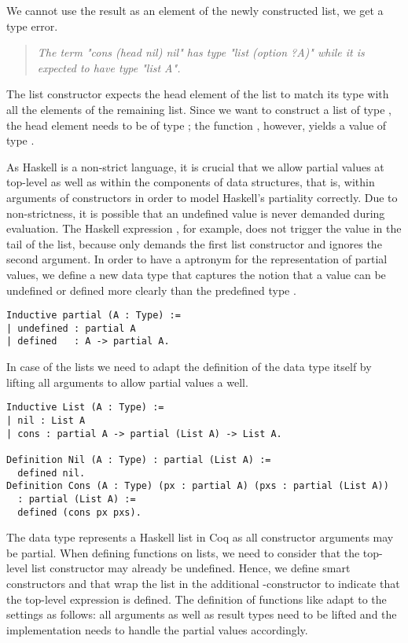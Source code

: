 We cannot use the result as an element of the newly constructed list, we get a type error.

\begin{quote}
\emph{The term "cons (head nil) nil" has type "list (option ?A)" while it is expected to have type "list A".}
\end{quote}

The list constructor  expects the head element of the list to match its type with all the elements of the remaining list.
Since we want to construct a list of type , the head element needs to be of type ; the function , however, yields a value of type .

As Haskell is a non-strict language, it is crucial that we allow partial values at top-level as well as within the components of data structures, that is, within arguments of constructors in order to model Haskell's partiality correctly.
Due to non-strictness, it is possible that an undefined value is never demanded during evaluation.
The Haskell expression , for example, does not trigger the  value in the tail of the list, because  only demands the first list constructor and ignores the second argument.
In order to have a aptronym for the representation of partial values, we define a new data type  that captures the notion that a value can be undefined or defined more clearly than the predefined type .

\begin{verbatim}
Inductive partial (A : Type) :=
| undefined : partial A
| defined   : A -> partial A.
\end{verbatim}

In case of the lists we need to adapt the definition of the data type itself by lifting all arguments to allow partial values a well.

\begin{verbatim}
Inductive List (A : Type) :=
| nil : List A
| cons : partial A -> partial (List A) -> List A.

Definition Nil (A : Type) : partial (List A) :=
  defined nil.
Definition Cons (A : Type) (px : partial A) (pxs : partial (List A)) 
  : partial (List A) :=
  defined (cons px pxs).
\end{verbatim}

The data type  represents a Haskell list in Coq as all constructor arguments may be partial.
When defining functions on lists, we need to consider that the top-level list constructor may already be undefined.
Hence, we define smart constructors  and  that wrap the list in the additional -constructor to indicate that the top-level expression is defined.
The definition of  functions like  adapt to the settings as follows: all arguments as well as result types need to be lifted and the implementation needs to handle the partial values accordingly.


